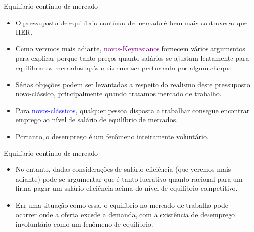 \documentclass[10pt]{beamer}
\begin{document}
\begin{frame}{Equilíbrio contínuo de mercado}
    \begin{itemize}
        \item O pressuposto de equilíbrio contínuo de mercado é bem mais controverso que HER.
        \bigskip
        \item Como veremos mais adiante, \textcolor{purple}{novos-Keynesianos} fornecem vários argumentos para explicar porque tanto preços quanto salários se ajustam lentamente para equilibrar os mercados após o sistema ser perturbado por algum choque.
        \bigskip
        \item Sérias objeções podem ser levantadas a respeito do realismo deste pressuposto novo-clássico, principalmente quando tratamos mercado de trabalho.
        \bigskip
        \item Para \textcolor{blue}{novos-clássicos}, qualquer pessoa disposta a trabalhar consegue encontrar emprego ao nível de salário de equilíbrio de mercados.
        \bigskip
        \item Portanto, o desemprego é um fenômeno inteiramente voluntário.
    \end{itemize}
\end{frame}

\begin{frame}{Equilíbrio contínuo de mercado}
    \begin{itemize}
        \item No entanto, dadas considerações de salário-eficiência (que veremos mais adiante) pode-se argumentar que é tanto lucrativo quanto racional para um firma pagar um salário-eficiência acima do nível de equilíbrio competitivo.
        \bigskip
        \item Em uma situação como essa, o equilíbrio no mercado de trabalho pode ocorrer onde a oferta excede a demanda, com a existência de desemprego involuntário como um fenômeno de equilíbrio.
    \end{itemize}
\end{frame}
\end{document}
